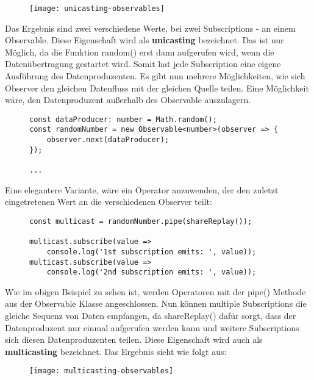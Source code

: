 \begin{figure}[H]
\begin{center}
\texttt{[image: unicasting-observables]}
\end{center}
\end{figure}

\noindent
Das Ergebnis sind zwei verschiedene Werte, bei zwei Subscriptions - an einem Observable. Diese Eigenschaft wird als \textbf{unicasting} bezeichnet. Das ist nur Möglich, da die Funktion random() erst dann aufgerufen wird, wenn die Datenübertragung gestartet wird. Somit hat jede Subscription eine eigene Ausführung des Datenproduzenten. Es gibt nun mehrere Möglichkeiten, wie sich Observer den gleichen Datenfluss mit der gleichen Quelle teilen. Eine Möglichkeit wäre, den Datenproduzent außerhalb des Observable auszulagern. 

\begin{figure}[H]
\begin{lstlisting}[basicstyle=\small]
const dataProducer: number = Math.random();
const randomNumber = new Observable<number>(observer => {
    observer.next(dataProducer);
});

...
\end{lstlisting}
\end{figure}

\noindent
Eine elegantere Variante, wäre ein Operator anzuwenden, der den zuletzt eingetretenen Wert an die verschiedenen Observer teilt:

\begin{figure}[H]
\begin{lstlisting}[basicstyle=\small]
const multicast = randomNumber.pipe(shareReplay());

multicast.subscribe(value =>
    console.log('1st subscription emits: ', value));
multicast.subscribe(value =>
    console.log('2nd subscription emits: ', value));
\end{lstlisting}
\end{figure}

\noindent
Wie im obigen Beispiel zu sehen ist, werden Operatoren mit der pipe() Methode aus der Observable Klasse angeschlossen. Nun können multiple Subscriptions die gleiche Sequenz von Daten empfangen, da shareReplay() dafür sorgt, dass der Datenproduzent nur einmal aufgerufen werden kann und weitere Subscriptions sich diesen Datenproduzenten teilen. Diese Eigenschaft wird auch als \textbf{multicasting} bezeichnet. Das Ergebnis sieht wie folgt aus:

\begin{figure}[H]
\begin{center}
\texttt{[image: multicasting-observables]}
\end{center}
\end{figure}

